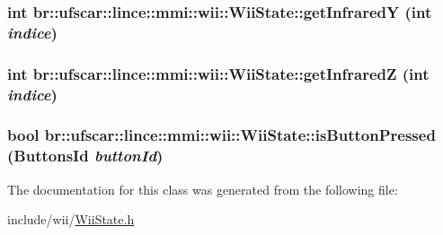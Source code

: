 \label{classbr_1_1ufscar_1_1lince_1_1mmi_1_1wii_1_1WiiState_a0868c5c47e73e7935310b1365a506a95}
\hypertarget{classbr_1_1ufscar_1_1lince_1_1mmi_1_1wii_1_1WiiState_a7bba650d1a0d183d586346512ce05d59}{
\subsubsection[{getInfraredY}]{\setlength{\rightskip}{0pt plus 5cm}int br::ufscar::lince::mmi::wii::WiiState::getInfraredY (int {\em indice})}}
\label{classbr_1_1ufscar_1_1lince_1_1mmi_1_1wii_1_1WiiState_a7bba650d1a0d183d586346512ce05d59}
\hypertarget{classbr_1_1ufscar_1_1lince_1_1mmi_1_1wii_1_1WiiState_a035fcde30816f5c1f834620ed86c91ff}{
\subsubsection[{getInfraredZ}]{\setlength{\rightskip}{0pt plus 5cm}int br::ufscar::lince::mmi::wii::WiiState::getInfraredZ (int {\em indice})}}
\label{classbr_1_1ufscar_1_1lince_1_1mmi_1_1wii_1_1WiiState_a035fcde30816f5c1f834620ed86c91ff}
\hypertarget{classbr_1_1ufscar_1_1lince_1_1mmi_1_1wii_1_1WiiState_ac62f1927a8a9e9b73fa26b426dd34fa0}{
\subsubsection[{isButtonPressed}]{\setlength{\rightskip}{0pt plus 5cm}bool br::ufscar::lince::mmi::wii::WiiState::isButtonPressed ({\bf ButtonsId} {\em buttonId})}}
\label{classbr_1_1ufscar_1_1lince_1_1mmi_1_1wii_1_1WiiState_ac62f1927a8a9e9b73fa26b426dd34fa0}


The documentation for this class was generated from the following file:\begin{DoxyCompactItemize}
\item 
include/wii/\hyperlink{WiiState_8h}{WiiState.h}\end{DoxyCompactItemize}
